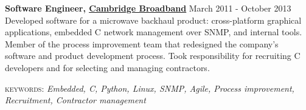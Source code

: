 \documentclass[10pt]{article}
\newcommand{\linkto}[2]{\href{#1}{\color{darkblue}\setulcolor{darkblue}\ul{#2}}}
\newcommand{\blankline}{\quad\pagebreak[2]}
\newif\ifkeywords\keywordstrue
\newcommand{\keywords}[1]%
        {\ifkeywords\par{\small \textsc{keywords:} \emph{#1}}\par\fi}
\begin{document}
\blankline








\textbf{Software Engineer, \linkto{http://cbnl.com}{Cambridge Broadband} } \hfill March 2011 - October 2013 \\
Developed software for a microwave backhaul product: cross-platform graphical applications, embedded C network management over SNMP, and internal tools. Member of the process improvement team that redesigned the company's software and product development process. Took responsibility for recruiting C developers and for selecting and managing contractors.
\keywords{Embedded, C, Python, Linux, SNMP, Agile, Process improvement, Recruitment, Contractor management}
\end{document}
